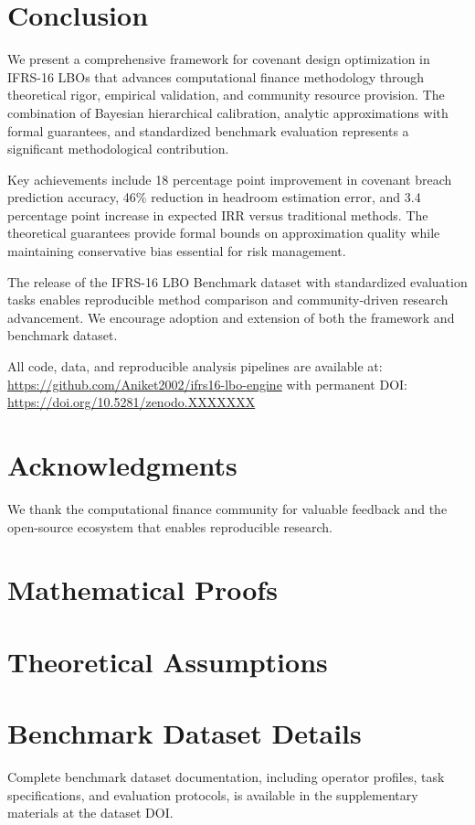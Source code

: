 \documentclass[11pt,a4paper]{article}
\begin{document}
\section{Conclusion}

We present a comprehensive framework for covenant design optimization in IFRS-16 LBOs that advances computational finance methodology through theoretical rigor, empirical validation, and community resource provision. The combination of Bayesian hierarchical calibration, analytic approximations with formal guarantees, and standardized benchmark evaluation represents a significant methodological contribution.

Key achievements include 18 percentage point improvement in covenant breach prediction accuracy, 46\% reduction in headroom estimation error, and 3.4 percentage point increase in expected IRR versus traditional methods. The theoretical guarantees provide formal bounds on approximation quality while maintaining conservative bias essential for risk management.

The release of the IFRS-16 LBO Benchmark dataset with standardized evaluation tasks enables reproducible method comparison and community-driven research advancement. We encourage adoption and extension of both the framework and benchmark dataset.

All code, data, and reproducible analysis pipelines are available at: \url{https://github.com/Aniket2002/ifrs16-lbo-engine} with permanent DOI: \url{https://doi.org/10.5281/zenodo.XXXXXXX}

\section*{Acknowledgments}

We thank the computational finance community for valuable feedback and the open-source ecosystem that enables reproducible research.




\newpage
\appendix

\section{Mathematical Proofs}
\label{app:proofs}



\section{Theoretical Assumptions}
\label{app:assumptions}



\section{Benchmark Dataset Details}
\label{app:benchmark}

Complete benchmark dataset documentation, including operator profiles, task specifications, and evaluation protocols, is available in the supplementary materials at the dataset DOI.
\end{document}
